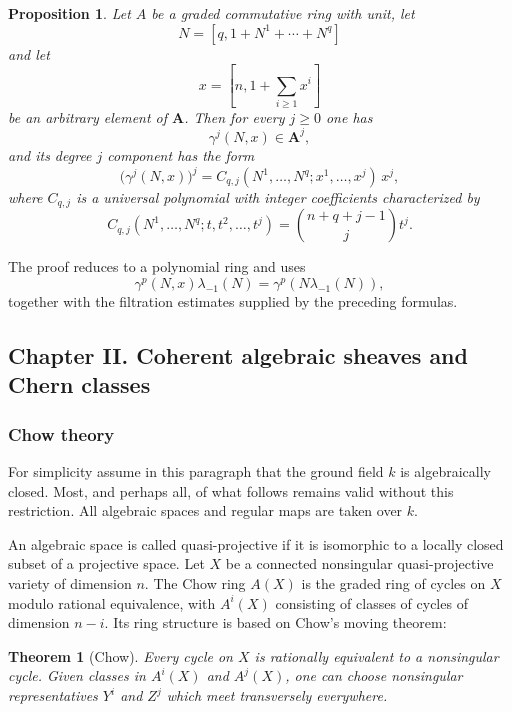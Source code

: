 \documentclass[14pt]{extarticle}
\newtheorem*{theorem*}{Theorem}
\newtheorem*{proposition*}{Proposition}
\begin{document}
\begin{proposition*}
Let $A$ be a graded commutative ring with unit, let
\[
   N=[q,1+N^1+\cdots+N^q]
\]
and let
\[
   x=[n,1+\sum_{i\geq1}x^i]
\]
be an arbitrary element of $\mathbf A$. Then for every $j\geq0$ one has
\[
   \gamma^j(N,x)\in\mathbf A^j,
\]
and its degree $j$ component has the form
\begin{equation}\label{eq:Cqj}
   \bigl(\gamma^j(N,x)\bigr)^j
   =C_{q,j}(N^1,\ldots,N^q;x^1,\ldots,x^j)\,x^j,
\end{equation}
where $C_{q,j}$ is a universal polynomial with integer coefficients characterized by
\begin{equation}\label{eq:Cchar}
   C_{q,j}(N^1,\ldots,N^q;t,t^2,\ldots,t^j)
   =\binom{n+q+j-1}{j}t^j.
\end{equation}
\end{proposition*}

The proof reduces to a polynomial ring and uses
\[
   \gamma^p(N,x)\lambda_{-1}(N)=\gamma^p(N\lambda_{-1}(N)),
\]
together with the filtration estimates supplied by the preceding formulas.

\subsection{Chapter II. Coherent algebraic sheaves and Chern classes}

\subsubsection{Chow theory}

For simplicity assume in this paragraph that the ground field $k$ is algebraically closed. Most, and perhaps all, of what follows remains valid without this restriction. All algebraic spaces and regular maps are taken over $k$.

An algebraic space is called quasi-projective if it is isomorphic to a locally closed subset of a projective space. Let $X$ be a connected nonsingular quasi-projective variety of dimension $n$. The Chow ring $A(X)$ is the graded ring of cycles on $X$ modulo rational equivalence, with $A^i(X)$ consisting of classes of cycles of dimension $n-i$. Its ring structure is based on Chow's moving theorem:

\begin{theorem*}[Chow]
Every cycle on $X$ is rationally equivalent to a nonsingular cycle. Given classes in $A^i(X)$ and $A^j(X)$, one can choose nonsingular representatives $Y^i$ and $Z^j$ which meet transversely everywhere.
\end{theorem*}
\end{document}
